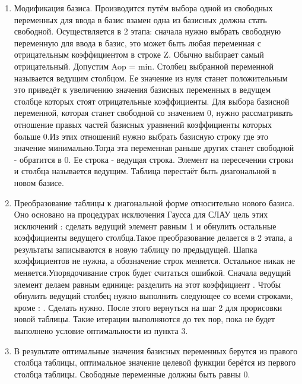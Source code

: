 \begin{enumerate}
  \item Модификация базиса. Производится путём выбора одной из свободных переменных для ввода в базис взамен одна из базисных должна стать свободной. Осуществляется в 2 этапа: сначала нужно выбрать свободную переменную для ввода в базис, это может быть любая переменная с отрицательным коэффициентом в строке Z. Обычно выбирает самый отрицательный. Допустим Aop = min. Столбец выбранной переменной называется ведущим столбцом. Ее значение из нуля станет положительным это приведёт к увеличению значения базисных переменных в ведущем столбце которых стоят отрицательные коэффициенты. Для выбора базисной переменной, которая станет свободной со значением 0, нужно рассматривать отношение правых частей базисных уравнений коэффициенты которых больше 0.Из этих отношений нужно выбрать базисную строку где это значение минимально.Тогда эта переменная раньше других станет свободной - обратится в 0. Ее строка - ведущая строка. Элемент на пересечении строки и столбца называется ведущим. Таблица перестаёт быть диагональной в новом базисе.
  \item Преобразование таблицы к диагональной форме относительно нового базиса. Оно основано на процедурах исключения Гаусса для СЛАУ цель этих исключений : сделать ведущий элемент равным 1 и обнулить остальные коэффициенты ведущего столбца.Такое преобразование делается в 2 этапа, а результаты записываются в новую таблицу по предыдущей. Шапка коэффициентов не нужна, а обозначение строк меняется. Остальное никак не меняется.Упорядочивание строк будет считаться ошибкой. Сначала ведущий элемент делаем равным единице: разделить на этот коэффициент . Чтобы обнулить ведущий столбец нужно выполнить следующее со всеми строками, кроме : . Сделать нужно. После этого вернуться на шаг 2 для прорисовки новой таблицы. Такие итерации выполняются до тех пор, пока не будет выполнено условие оптимальности из пункта 3.
\item В результате оптимальные значения базисных переменных берутся из правого столбца таблицы, оптимальное значение целевой функции берётся из первого столбца таблицы. Свободные переменные должны быть равны 0.

\end{enumerate}



